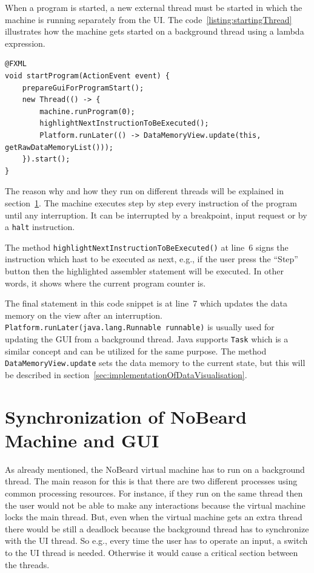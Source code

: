 When a program is started, a new external thread must be started in which the machine is running separately from the UI. The code~\ref{listing:startingThread} illustrates how the machine gets started on a background thread using a lambda expression.
\begin{lstlisting}[caption={Starting the machine on a new thread},label=listing:startingThread]
@FXML
void startProgram(ActionEvent event) {
    prepareGuiForProgramStart();
    new Thread(() -> {
        machine.runProgram(0);
        highlightNextInstructionToBeExecuted();
        Platform.runLater(() -> DataMemoryView.update(this, getRawDataMemoryList()));
    }).start();
}
\end{lstlisting}
The reason why and how they run on different threads will be explained in section~\ref{sec:synchronization}. The machine executes step by step every instruction of the program until any interruption. It can be interrupted by a breakpoint, input request or by a \lstinline$halt$ instruction. 

The method \lstinline$highlightNextInstructionToBeExecuted()$ at line~6 signs the instruction which hast to be executed as next, e.g., if the user press the ``Step'' button then the highlighted assembler statement will be executed. In other words, it shows where the current program counter is.

The final statement in this code snippet is at line~7 which updates the data memory on the view after an interruption. \lstinline$Platform.runLater(java.lang.Runnable runnable)$ is usually used for updating the GUI from a background thread. Java supports \lstinline$Task$ which is a similar concept and can be utilized for the same purpose. The method \lstinline$DataMemoryView.update$ sets the data memory to the current state, but this will be described in section~\ref{sec:implementationOfDataVisualisation}.

\section{Synchronization of NoBeard Machine and GUI}
\label{sec:synchronization} 
As already mentioned, the NoBeard virtual machine has to run on a background thread. The main reason for this is that there are two different processes using common processing resources. For instance, if they run on the same thread then the user would not be able to make any interactions because the virtual machine locks the main thread. But, even when the virtual machine gets an extra thread there would be still a deadlock because the background thread has to synchronize with the UI thread. So e.g., every time the user has to operate an input, a switch to the UI thread is needed. Otherwise it would cause a critical section between the threads. 

